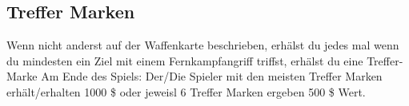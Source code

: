 \subsection{Treffer Marken}

Wenn nicht anderst auf der Waffenkarte beschrieben, erhälst du jedes mal wenn du mindesten ein Ziel
mit einem Fernkampfangriff triffst, erhälst du eine Treffer-Marke
Am Ende des Spiels: Der/Die Spieler mit den meisten Treffer Marken erhält/erhalten 1000 \$ oder jeweisl
6 Treffer Marken ergeben 500 \$ Wert.

